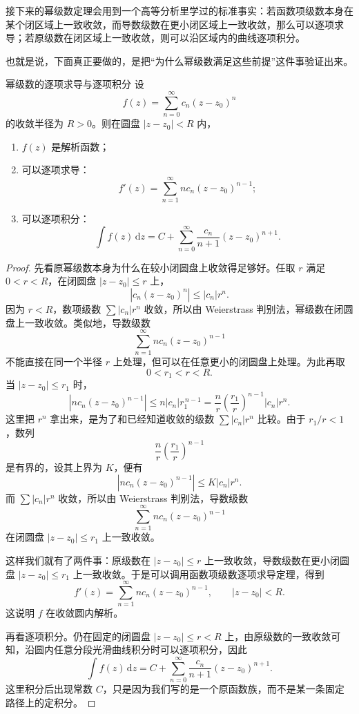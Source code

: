 \begin{tishi}[下面还要调用一个前修结论]
接下来的幂级数定理会用到一个高等分析里学过的标准事实：若函数项级数本身在某个闭区域上一致收敛，而导数级数在更小闭区域上一致收敛，那么可以逐项求导；若原级数在闭区域上一致收敛，则可以沿区域内的曲线逐项积分。

也就是说，下面真正要做的，是把``为什么幂级数满足这些前提''这件事验证出来。
\end{tishi}

\begin{dingli}{幂级数的逐项求导与逐项积分}{}
设
\[
    f(z)=\sum_{n=0}^{\infty} c_n (z-z_0)^n
\]
的收敛半径为 $R>0$。则在圆盘 $|z-z_0|<R$ 内，
\begin{enumerate}
    \item $f(z)$ 是解析函数；
    \item 可以逐项求导：
    \[
        f'(z)=\sum_{n=1}^{\infty} n c_n (z-z_0)^{n-1};
    \]
    \item 可以逐项积分：
    \[
        \int f(z)\,\mathrm{d}z
        = C+\sum_{n=0}^{\infty} \frac{c_n}{n+1}(z-z_0)^{n+1}.
    \]
\end{enumerate}
\end{dingli}

\begin{proof}
先看原幂级数本身为什么在较小闭圆盘上收敛得足够好。任取 $r$ 满足 $0<r<R$，在闭圆盘 $|z-z_0|\le r$ 上，
\[
    |c_n(z-z_0)^n| \le |c_n|r^n.
\]
因为 $r<R$，数项级数 $\sum |c_n|r^n$ 收敛，所以由 Weierstrass 判别法，幂级数在闭圆盘上一致收敛。类似地，导数级数
\[
    \sum_{n=1}^{\infty} n c_n (z-z_0)^{n-1}
\]
不能直接在同一个半径 $r$ 上处理，但可以在任意更小的闭圆盘上处理。为此再取
\[
    0<r_1<r<R.
\]
当 $|z-z_0|\le r_1$ 时，
\[
    |n c_n (z-z_0)^{n-1}|
    \le n|c_n|r_1^{\,n-1}
    = \frac{n}{r}\left(\frac{r_1}{r}\right)^{n-1}|c_n|r^n.
\]
这里把 $r^n$ 拿出来，是为了和已经知道收敛的级数 $\sum |c_n|r^n$ 比较。由于 $r_1/r<1$，数列
\[
    \frac{n}{r}\left(\frac{r_1}{r}\right)^{n-1}
\]
是有界的，设其上界为 $K$，便有
\[
    |n c_n (z-z_0)^{n-1}| \le K |c_n| r^n.
\]
而 $\sum |c_n|r^n$ 收敛，所以由 Weierstrass 判别法，导数级数
\[
    \sum_{n=1}^{\infty} n c_n (z-z_0)^{n-1}
\]
在闭圆盘 $|z-z_0|\le r_1$ 上一致收敛。

这样我们就有了两件事：原级数在 $|z-z_0|\le r$ 上一致收敛，导数级数在更小闭圆盘 $|z-z_0|\le r_1$ 上一致收敛。于是可以调用函数项级数逐项求导定理，得到
\[
    f'(z)=\sum_{n=1}^{\infty} n c_n (z-z_0)^{n-1},\qquad |z-z_0|<R.
\]
这说明 $f$ 在收敛圆内解析。

再看逐项积分。仍在固定的闭圆盘 $|z-z_0|\le r<R$ 上，由原级数的一致收敛可知，沿圆内任意分段光滑曲线积分时可以逐项积分，因此
\[
    \int f(z)\,\mathrm{d}z
    = C+\sum_{n=0}^{\infty}\frac{c_n}{n+1}(z-z_0)^{n+1}.
\]
这里积分后出现常数 $C$，只是因为我们写的是一个原函数族，而不是某一条固定路径上的定积分。
\end{proof}

